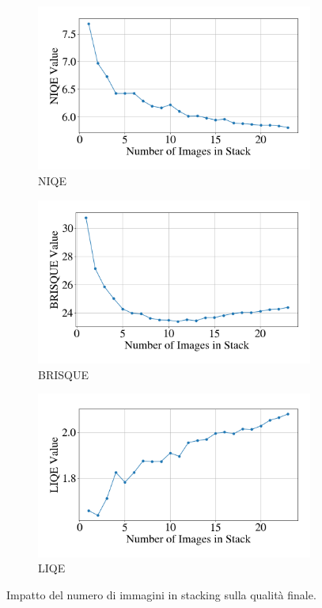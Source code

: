 \begin{figure}[H]
    \centering
    \begin{subfigure}[t]{0.325\textwidth}
        \centering
        \includegraphics[width=\linewidth]{../assets/n_stack_NIQE.png}
        \caption{NIQE}
        \label{fig:n_stack_niqe}
    \end{subfigure}
    \hfill
    \begin{subfigure}[t]{0.325\textwidth}
        \centering
        \includegraphics[width=\linewidth]{../assets/n_stack_BRISQUE.png}
        \caption{BRISQUE}
        \label{fig:n_stack_brisque}
    \end{subfigure}
    \hfill
    \begin{subfigure}[t]{0.325\textwidth}
        \centering
        \includegraphics[width=\linewidth]{../assets/n_stack_LIQE.png}
        \caption{LIQE}
        \label{fig:n_stack_liqe}
    \end{subfigure}
    \caption{Impatto del numero di immagini in stacking sulla qualità finale.}


\end{figure}
